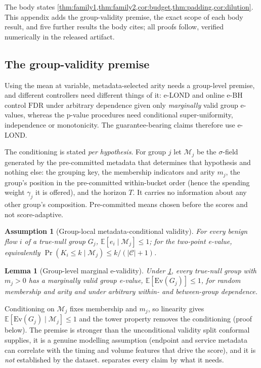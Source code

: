 \documentclass[conference]{IEEEtran}
\newtheorem{lemma}{Lemma}
\newtheorem{assumption}{Assumption}
\newcommand{\Cal}{\mathcal{C}}
\newcommand{\nCal}{\lvert\Cal\rvert}
\newcommand{\Ev}{\mathrm{Ev}}
\newcommand{\FDR}{\mathrm{FDR}}
\begin{document}
The body states \cref{thm:family1,thm:family2,cor:budget,thm:padding,cor:dilution}. This appendix adds the
group-validity premise, the exact scope of each body result, and five further results the body cites;
all proofs follow, verified numerically in the released artifact.

\subsection{The group-validity premise}\label{app:groupval}

Using the mean at variable, metadata-selected arity needs a group-level premise, and different
controllers need different things of it: e-LOND and online e-BH control $\FDR$ under arbitrary
dependence given only \emph{marginally} valid group e-values, whereas the p-value procedures need
conditional super-uniformity, independence or monotonicity. The guarantee-bearing claims therefore use
e-LOND.

The conditioning is stated \emph{per hypothesis}. For group $j$ let $\mathcal M_j$ be the
$\sigma$-field generated by the pre-committed metadata that determines that hypothesis and nothing else:
the grouping key, the membership indicators and arity $m_j$, the group's position in the pre-committed
within-bucket order (hence the spending weight $\gamma_j$ it is offered), and the horizon $T$. It
carries no information about any other group's composition. Pre-committed means chosen before the scores
and not score-adaptive.

\begin{assumption}[Group-local metadata-conditional validity]\label{assump:groupval}
For every benign flow $i$ of a true-null group $G_j$, $\mathbb E[e_i\mid\mathcal M_j]\le1$; for the
two-point e-value, equivalently $\Pr(K_i\le k\mid\mathcal M_j)\le k/(\nCal+1)$.
\end{assumption}

\begin{lemma}[Group-level marginal e-validity]\label{lem:groupval}
Under \cref{assump:groupval}, every true-null group with $m_j>0$ has a marginally valid group e-value,
$\mathbb E[\Ev(G_j)]\le1$, for random membership and arity and under arbitrary within- and between-group
dependence.
\end{lemma}

Conditioning on $\mathcal M_j$ fixes membership and $m_j$, so linearity gives
$\mathbb E[\Ev(G_j)\mid\mathcal M_j]\le1$ and the tower property removes the conditioning (proof
below). The premise is stronger than the unconditional validity split conformal supplies, it is a
genuine modelling assumption (endpoint and service metadata can correlate with the timing and volume
features that drive the score), and it is \emph{not} established by the dataset. 
separates every claim by what it needs.
\end{document}
